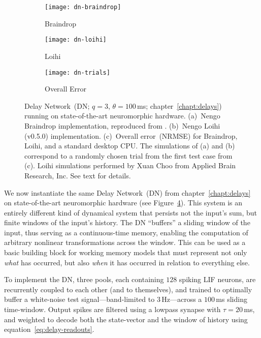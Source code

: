 \begin{figure}
  \centering
  \begin{subfigure}{.5\textwidth}
    \centering
    \texttt{[image: dn-braindrop]}
    \caption{Braindrop}
    \label{fig:dn-braindrop}
  \end{subfigure}%
  \begin{subfigure}{.5\textwidth}
    \centering
    \texttt{[image: dn-loihi]}
    \caption{Loihi}
    \label{fig:dn-loihi}
  \end{subfigure}
  \begin{subfigure}{\textwidth}
    \centering
    \vspace{2em}
    \texttt{[image: dn-trials]}
    \caption{Overall Error}
    \label{fig:dn-trials}
  \end{subfigure}
  \caption[Dynamical memory on Braindrop and Loihi.]{ \label{fig:dn-neuromorphic}
    Delay Network~(DN; $q=3$, $\theta=100$\,ms; chapter~\ref{chapt:delays}) running on state-of-the-art neuromorphic hardware.
    (a)~Nengo Braindrop implementation, reproduced from \citet[][Figure~16]{braindrop2019}. 
    (b)~Nengo Loihi (v0.5.0) implementation.
    (c)~Overall error~(NRMSE) for Braindrop, Loihi, and a standard desktop CPU.
    The simulations of (a) and (b) correspond to a randomly chosen trial from the first test case from (c).
    Loihi simulations performed by Xuan Choo from Applied Brain Research, Inc.
    See text for details.
  }
\end{figure}

We now instantiate the same Delay Network~(DN) from chapter~\ref{chapt:delays} on state-of-the-art neuromorphic hardware (see Figure~\ref{fig:dn-neuromorphic}).
This system is an entirely different kind of dynamical system that persists not the input's sum, but finite windows of the input's history.
The DN ``buffers'' a sliding window of the input, thus serving as a continuous-time memory, enabling the computation of arbitrary nonlinear transformations across the window.
This can be used as a basic building block for working memory models that must represent not only \emph{what} has occurred, but also \emph{when} it has occurred in relation to everything else.


To implement the DN, three pools, each containing $128$ spiking LIF neurons, are recurrently coupled to each other (and to themselves), and trained to optimally buffer a white-noise test signal---band-limited to $3$\,Hz---across a $100$\,ms sliding time-window.
Output spikes are filtered using a lowpass synapse with $\tau = 20$\,ms, and weighted to decode both the state-vector and the window of history using equation~\ref{eq:delay-readouts}.

